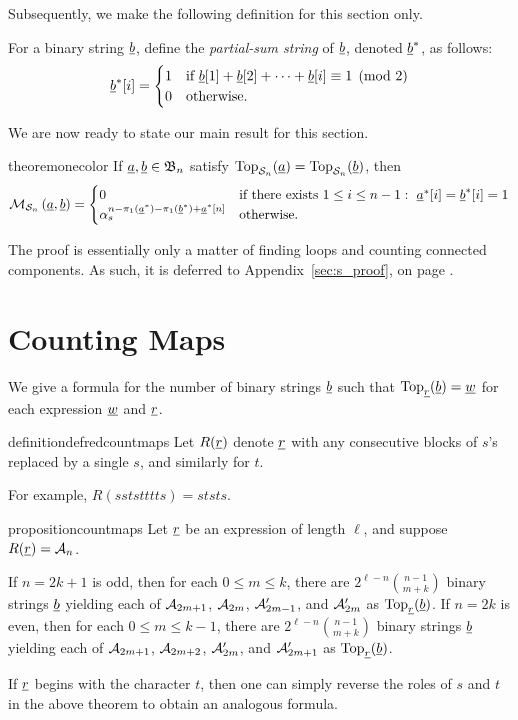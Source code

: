 Subsequently, we make the following definition for this section only.
\begin{definition}
	For a binary string $\ul b$, define the \emph{partial-sum string} of $\ul b$, denoted $\ul b^\ast$, as follows:
	\[
		\ul b^\ast [i] = 
		\begin{cases}
			1 & \text{if } \ul b[1] + \ul b[2] + \dots + \ul b[i] \equiv 1 \pmod{2} \\
			0 & \text{otherwise}.
		\end{cases}
	\]
\end{definition}
We are now ready to state our main result for this section. 
\begin{restatable}{theorem}{onecolor}
	If $\ul a, \ul b \in \BB_n$ satisfy $\Top_{\SS_n}(\ul a) = \Top_{\SS_n}(\ul b)$, then
	\[
		\MM_{\SS_n} \left( \ul a, \ul b \right)
		=
		\begin{cases}
			0 & \text{if there exists } 1 \le i \le n-1:\ \ul a^\ast[i] = \ul b^\ast[i] = 1 \\
			\alpha_s^{n - \pi_1(\ul a^\ast) - \pi_1(\ul b^\ast) + \ul a^\ast[n]} & \text{otherwise}.
		\end{cases}
	\]
	\label{thm:onecolor}
\end{restatable}
The proof is essentially only a matter of finding loops and counting connected components.
As such, it is deferred to Appendix~\ref{sec:s_proof}, on page \pageref{sec:s_proof}.

\section{Counting Maps}
\label{sec:res_count_maps}
We give a formula for the number of binary strings $\ul b$ such that $\Top_{\ul r}(\ul b) = \ul w$ for each expression $\ul w$ and $\ul r$.  

\begin{restatable}{definition}{defredcountmaps}
	Let $R(\ul r)$ denote $\ul r$ with any consecutive blocks of $s$'s replaced by a single $s$, and similarly for $t$.
\end{restatable}
For example, $R(sststttts) = ststs$.

\begin{restatable}{proposition}{countmaps}
	Let $\ul r$ be an expression of length $\ell$, and suppose $R(\ul r) = \AA_n$.
	\begin{enumerate}[(i)]
		\ii If $n=2k+1$ is odd, then for each $0 \le m \le k$, there are $2^{\ell-n} \binom{n-1}{m+k}$ binary strings $\ul b$ yielding each of $\AA_{2m+1}$, $\AA_{2m}$, $\AA_{2m-1}'$, and $\AA_{2m}'$ as $\Top_{\ul r}(\ul b)$.
		\ii If $n=2k$ is even, then for each $0 \le m \le k-1$, there are $2^{\ell-n} \binom{n-1}{m+k}$ binary strings $\ul b$ yielding each of $\AA_{2m+1}$, $\AA_{2m+2}$, $\AA_{2m}'$, and $\AA_{2m+1}'$ as $\Top_{\ul r}(\ul b)$.
	\end{enumerate}
	\label{thm:count_maps}
\end{restatable}
If $\ul r$ begins with the character $t$, then one can simply reverse the roles of $s$ and $t$ in the above theorem to obtain an analogous formula.

